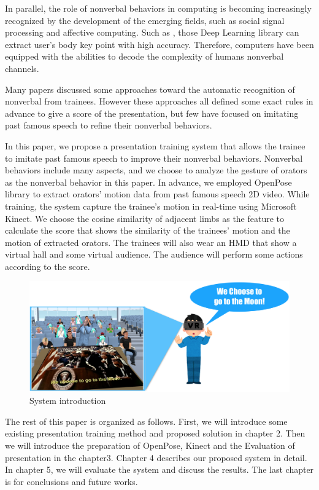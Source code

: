 \par In parallel, the role of nonverbal behaviors in computing is becoming increasingly recognized by the development of the emerging fields, such as social signal processing and affective computing. Such as \cite{Chen,cao2017realtime,Fang2016,Papandreou2017,He2017}, those Deep Learning library can extract user's body key point with high accuracy. Therefore, computers have been equipped with the abilities to decode the complexity of humans nonverbal channels. 

\par Many papers discussed some approaches toward the automatic recognition of nonverbal from trainees. However these approaches all defined some exact rules in advance to give a score of the presentation, but few have focused on imitating past famous speech to refine their nonverbal behaviors. 
 
\par In this paper, we propose a presentation training system that allows the trainee to imitate past famous speech to improve their nonverbal behaviors. Nonverbal behaviors include many aspects, and we choose to analyze the gesture of orators as the nonverbal behavior in this paper. In advance, we employed OpenPose library\cite{cao2017realtime} to extract orators' motion data from past famous speech 2D video. While training, the system capture the trainee's motion in real-time using Microsoft Kinect. We choose the cosine similarity of adjacent limbs as the feature to calculate the score that shows the similarity of the trainees' motion and the motion of extracted orators. The trainees will also wear an HMD that show a virtual hall and some virtual audience. The audience will perform some actions according to the score.
\begin{figure}[htbp]
\centering\includegraphics[scale=0.225]{./img/Introduction.png}
\caption{System introduction}\label{fig:System introduction}
\end{figure}

\par The rest of this paper is organized as follows. First, we will introduce some existing presentation training method and proposed solution in chapter 2. Then we will introduce the preparation of OpenPose, Kinect and the Evaluation of presentation in the chapter3. Chapter 4 describes our proposed system in detail. In chapter 5, we will evaluate the system and discuss the results. The last chapter is for conclusions and future works.

